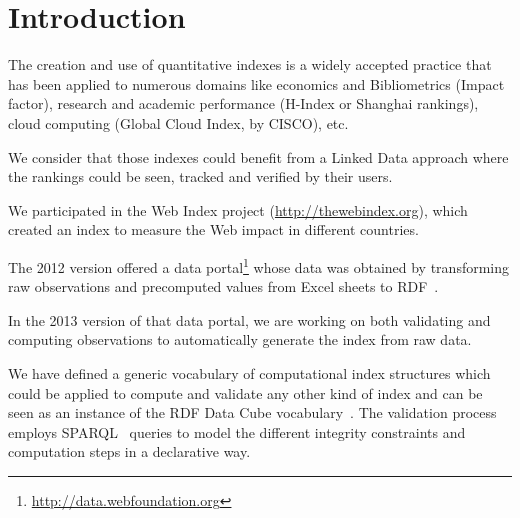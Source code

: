 \documentclass{acm_proc_article-sp}
\newcommand{\footnoteUrl}[1]{\footnote{\url{#1}}}
\begin{document}



\section{Introduction}

The creation and use of quantitative indexes is a widely 
accepted practice that has been applied to numerous domains like economics and
Bibliometrics (Impact factor), 
research and academic performance (H-Index or Shanghai rankings), 
 cloud computing (Global Cloud Index, by CISCO), 
etc.

We consider that those indexes could benefit from a 
 Linked Data approach where the rankings could be seen, tracked and 
 verified by their users.

We participated in the Web Index project
(\url{http://thewebindex.org}), which created an index to measure 
 the Web impact in different countries.

The 2012 version offered a data
portal\footnoteUrl{http://data.webfoundation.org} whose data was obtained 
by transforming raw observations and precomputed values 
from Excel sheets to RDF~\cite{Alvarez13}. 

In the 2013 version of that data portal, we are working on 
both validating and computing observations to automatically generate
the index from raw data.

We have defined a generic vocabulary 
of computational index structures which could be applied to compute and validate any other kind of
index and can be seen as an instance of the RDF Data Cube
vocabulary~\cite{Cube}.
The validation process employs SPARQL~\cite{SPARQL11} queries to model the 
 different integrity constraints and computation steps in a declarative way.


\end{document}

